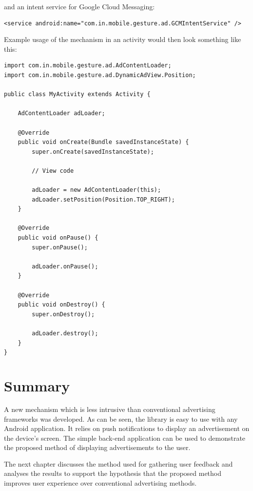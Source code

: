 and an intent service for Google Cloud Messaging:

\begin{lstlisting}
<service android:name="com.in.mobile.gesture.ad.GCMIntentService" />
\end{lstlisting}

Example usage of the mechanism in an activity would then look something like this:

\lstset{language=Java}

\begin{lstlisting}
import com.in.mobile.gesture.ad.AdContentLoader;
import com.in.mobile.gesture.ad.DynamicAdView.Position;

public class MyActivity extends Activity {

    AdContentLoader adLoader;

    @Override
    public void onCreate(Bundle savedInstanceState) {
        super.onCreate(savedInstanceState);

        // View code

        adLoader = new AdContentLoader(this);
        adLoader.setPosition(Position.TOP_RIGHT);
    }

    @Override
    public void onPause() {
        super.onPause();

        adLoader.onPause();
    }

    @Override
    public void onDestroy() {
        super.onDestroy();

        adLoader.destroy();
    }
}
\end{lstlisting}

\section{Summary}

A new mechanism which is less intrusive than conventional advertising frameworks was developed. As can be seen, the library is easy to use with any Android application. It relies on push notifications to display an advertisement on the device's screen. The simple back-end application can be used to demonstrate the proposed method of displaying advertisements to the user.

The next chapter discusses the method used for gathering user feedback and analyses the results to support the hypothesis that the proposed method improves user experience over conventional advertising methods.